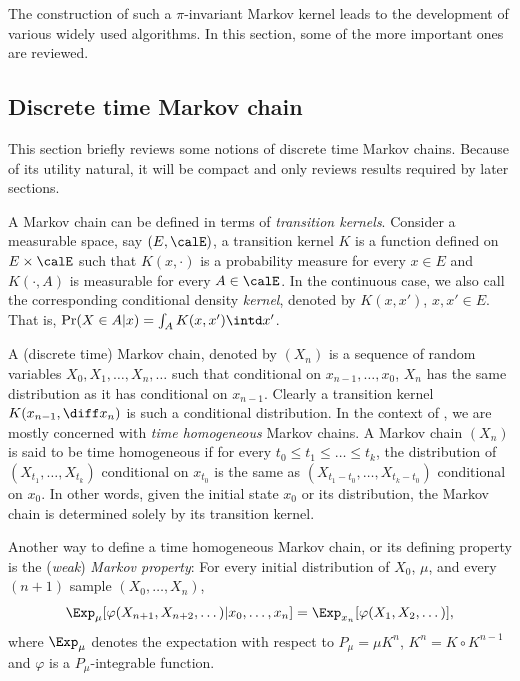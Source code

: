 The construction of such a $\pi$-invariant Markov kernel leads to the
development of various widely used \mcmc algorithms. In this section, some of
the more important ones are reviewed.

\subsection{Discrete time Markov chain}
\label{sub:Discrete time Markov chain}

This section briefly reviews some notions of discrete time Markov chains.
Because of its utility natural, it will be compact and only reviews results
required by later sections.

A Markov chain can be defined in terms of \emph{transition kernels}. Consider
a measurable space, say $(E,\calE)$, a transition kernel $K$ is a function defined
on $E\times\calE$ such that $K(x,\cdot)$ is a probability measure for every
$x\in E$ and $K(\cdot,A)$ is measurable for every $A\in\calE$. In the
continuous case, we also call the corresponding conditional density
\emph{kernel}, denoted by $K(x,x')$, $x,x'\in E$. That is, $\Pr(X\in A|x) =
\int_A K(x,x')\intd x'$.

A (discrete time) Markov chain, denoted by $(X_n)$ is a sequence of random
variables $X_0,X_1,\dots,X_n,\dots$ such that conditional on
$x_{n-1},\dots,x_0$, $X_n$ has the same distribution as it has conditional on
$x_{n-1}$. Clearly a transition kernel $K(x_{n-1},\diff x_n)$ is such a
conditional distribution. In the context of \mcmc, we are mostly concerned
with \emph{time homogeneous} Markov chains. A Markov chain $(X_n)$ is said to
be time homogeneous if for every $t_0\le t_1\le\dots\le t_k$, the distribution
of $(X_{t_1},\dots,X_{t_k})$ conditional on $x_{t_0}$ is the same as
$(X_{t_1-t_0},\dots,X_{t_k-t_0})$ conditional on $x_0$. In other words, given
the initial state $x_0$ or its distribution, the Markov chain is determined
solely by its transition kernel.


Another way to define a time homogeneous Markov chain, or its defining
property is the (\emph{weak}) \emph{Markov property}: For every initial
distribution of $X_0$, $\mu$, and every $(n+1)$ sample $(X_0,\dots,X_n)$,
\begin{equation}
  \Exp_{\mu}[\varphi(X_{n+1},X_{n+2},\dots)|x_0,\dots,x_n] =
  \Exp_{x_n}[\varphi(X_1,X_2,\dots)],
\end{equation}
where $\Exp_{\mu}$ denotes the expectation with respect to $P_{\mu} = \mu
K^n$, $K^n = K\vysmwhtcircle K^{n-1}$ and $\varphi$ is a $P_{\mu}$-integrable
function.

